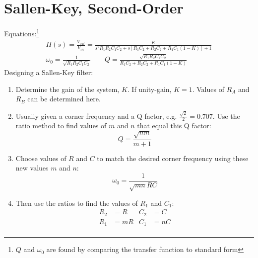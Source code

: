 \section{Sallen-Key, Second-Order}
Equations:\footnote{$Q$ and $\omega_0$ are found by comparing the transfer function to standard form}
\begin{gather*}
H(s)=\frac{V_{out}}{V_{in}}=\frac{K}{s^2 R_1 R_2 C_1 C_2 + s\left[R_1 C_2 + R_2 C_2 + R_1 C_1\left(1-K\right)\right]+1}\\
\omega_0=\frac{1}{\sqrt{R_1 R_2 C_1 C_2}} \qquad Q = \frac{\sqrt{R_1 R_2 C_1 C_2}}{R_1 C_2 + R_2 C_2 + R_1 C_1\left(1-K\right)}
\end{gather*}
Designing a Sallen-Key filter:
\begin{enumerate}
	\item Determine the gain of the system, $K$. If unity-gain, $K=1$. Values of $R_A$ and $R_B$ can be determined here.
	\item Usually given a corner frequency and a Q factor, e.g. $\frac{\sqrt{2}}{2}=0.707$. Use the ratio method to find values of $m$ and $n$ that equal this Q factor:
	\[Q=\frac{\sqrt{mn}}{m+1}\]
	\item Choose values of $R$ and $C$ to match the desired corner frequency using these new values $m$ and $n$:
	\[\omega_0=\frac{1}{\sqrt{mn}RC}\]
	\item Then use the ratios to find the values of $R_1$ and $C_1$:
	\begin{align*}
	R_2 &= R & C_2 &= C\\
	R_1 &= mR & C_1 &= nC \\
	\end{align*}
\end{enumerate}











